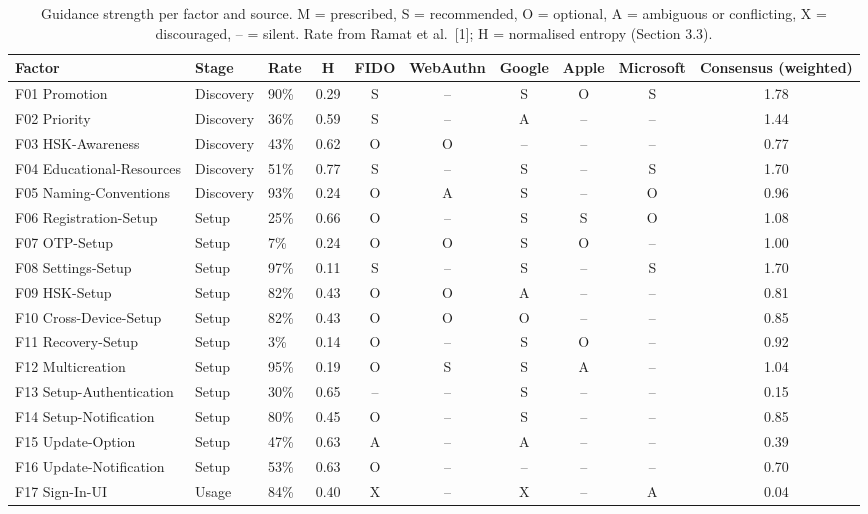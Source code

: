 \documentclass[letterpaper,twocolumn,10pt]{article}
\begin{document}
\begin{table}[t]\centering\scriptsize\setlength{\tabcolsep}{3pt}\caption{Guidance strength per factor and source. M = prescribed, S = recommended, O = optional, A = ambiguous or conflicting, X = discouraged, -- = silent. Rate from Ramat et al.~{[}1{]}; H = normalised entropy (Section 3.3).}\label{tab:2}
\begin{tabularx}{\textwidth}{>{\raggedright\arraybackslash}Xllccccccc}\toprule
\textbf{Factor} & \textbf{Stage} & \textbf{Rate} & \textbf{H} & \textbf{FIDO} & \textbf{WebAuthn} & \textbf{Google} & \textbf{Apple} & \textbf{Microsoft} & \textbf{Consensus (weighted)} \\ \midrule
F01 Promotion & Discovery & 90\% & 0.29 & S & -- & S & O & S & 1.78 \\
F02 Priority & Discovery & 36\% & 0.59 & S & -- & A & -- & -- & 1.44 \\
F03 HSK-Awareness & Discovery & 43\% & 0.62 & O & O & -- & -- & -- & 0.77 \\
F04 Educational-Resources & Discovery & 51\% & 0.77 & S & -- & S & -- & S & 1.70 \\
F05 Naming-Conventions & Discovery & 93\% & 0.24 & O & A & S & -- & O & 0.96 \\
F06 Registration-Setup & Setup & 25\% & 0.66 & O & -- & S & S & O & 1.08 \\
F07 OTP-Setup & Setup & 7\% & 0.24 & O & O & S & O & -- & 1.00 \\
F08 Settings-Setup & Setup & 97\% & 0.11 & S & -- & S & -- & S & 1.70 \\
F09 HSK-Setup & Setup & 82\% & 0.43 & O & O & A & -- & -- & 0.81 \\
F10 Cross-Device-Setup & Setup & 82\% & 0.43 & O & O & O & -- & -- & 0.85 \\
F11 Recovery-Setup & Setup & 3\% & 0.14 & O & -- & S & O & -- & 0.92 \\
F12 Multicreation & Setup & 95\% & 0.19 & O & S & S & A & -- & 1.04 \\
F13 Setup-Authentication & Setup & 30\% & 0.65 & -- & -- & S & -- & -- & 0.15 \\
F14 Setup-Notification & Setup & 80\% & 0.45 & O & -- & S & -- & -- & 0.85 \\
F15 Update-Option & Setup & 47\% & 0.63 & A & -- & A & -- & -- & 0.39 \\
F16 Update-Notification & Setup & 53\% & 0.63 & O & -- & -- & -- & -- & 0.70 \\
F17 Sign-In-UI & Usage & 84\% & 0.40 & X & -- & X & -- & A & 0.04 \\

\end{tabularx}
\end{table}
\end{document}
